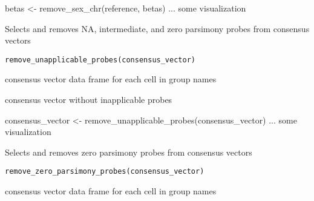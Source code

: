 \documentclass[a4paper]{book}
\begin{document}
%
\begin{Examples}
\begin{ExampleCode}
betas <- remove_sex_chr(reference, betas)
... some visualization 
\end{ExampleCode}
\end{Examples}
%
\begin{Description}\relax
Selects and removes NA, intermediate, and zero parsimony probes from 
consensus vectors
\end{Description}
%
\begin{Usage}
\begin{verbatim}
remove_unapplicable_probes(consensus_vector)
\end{verbatim}
\end{Usage}
%
\begin{Arguments}
\begin{ldescription}
\item[\code{consensus\_vector}] consensus vector data frame for each cell in group 
names
\end{ldescription}
\end{Arguments}
%
\begin{Value}
consensus vector without inapplicable probes
\end{Value}
%
\begin{Examples}
\begin{ExampleCode}
consensus_vector <- remove_unapplicable_probes(consensus_vector)
... some visualization 
\end{ExampleCode}
\end{Examples}
%
\begin{Description}\relax
Selects and removes zero parsimony probes from consensus vectors
\end{Description}
%
\begin{Usage}
\begin{verbatim}
remove_zero_parsimony_probes(consensus_vector)
\end{verbatim}
\end{Usage}
%
\begin{Arguments}
\begin{ldescription}
\item[\code{consensus\_vector}] consensus vector data frame for each cell in group 
names
\end{ldescription}
\end{Arguments}
\end{document}
